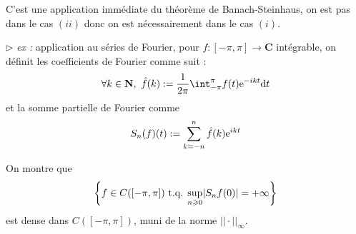 \documentclass[a4paper,11pt, twoside]{article}
\begin{document}
\begin{Proof}
  C'est une application immédiate du théorème de Banach-Steinhaus, on est pas dans le cas $(ii)$ donc on est nécessairement dans le cas $(i)$.
\end{Proof}

$\triangleright$\emph{ ex : }application au séries de Fourier, pour $f:[-\pi,\pi]\longrightarrow\mathbf C$ intégrable, on définit les coefficients de Fourier comme suit :
$$\forall k\in \N,\ \hat f(k):=\frac{1}{2\pi}\int_{-\pi}^{\pi}f(t)\ex{-ikt}\mathrm dt$$
et la somme partielle de Fourier comme 
$$S_n(f)(t):=\sum_{k=-n}^n\hat f(k)\mathrm{e}^{ikt}$$

On montre que 
$$\left\{f\in C([-\pi,\pi])\text{ t.q. } \underset{n\geqslant 0}{\mathrm{sup}}|S_nf(0)|=+\infty\right\}$$
est dense dans $C([-\pi,\pi])$, muni de la norme $||\cdot||_{\infty}$.
\end{document}
